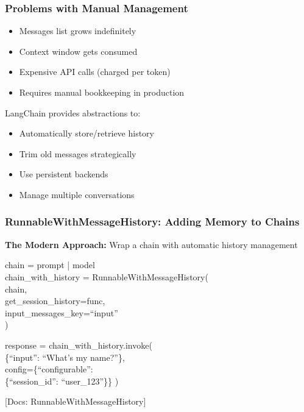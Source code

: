 \documentclass[aspectratio=169,11pt]{beamer}
\newcommand{\docref}[1]{{\scriptsize\color{docgray}[Docs: #1]}}
\begin{document}
\begin{frame}
  \frametitle{Problems with Manual Management}
  \begin{warningbox}
    \begin{itemize}
      \item Messages list grows indefinitely
      \item Context window gets consumed
      \item Expensive API calls (charged per token)
      \item Requires manual bookkeeping in production
    \end{itemize}
  \end{warningbox}
  \vspace{0.6em}
  \begin{tipbox}
    LangChain provides abstractions to:
    \begin{itemize}
      \item Automatically store/retrieve history
      \item Trim old messages strategically
      \item Use persistent backends
      \item Manage multiple conversations
    \end{itemize}
  \end{tipbox}
\end{frame}

\begin{frame}
  \frametitle{RunnableWithMessageHistory: Adding Memory to Chains}
  \textbf{The Modern Approach:} Wrap a chain with automatic history management
  \vspace{0.4em}
  \begin{codebox}[Setup]
    \ttfamily\small
    chain = prompt | model \\
    chain\_with\_history = RunnableWithMessageHistory( \\
    \hspace{2em} chain, \\
    \hspace{2em} get\_session\_history=func, \\
    \hspace{2em} input\_messages\_key=``input'' \\
    )
  \end{codebox}
  \vspace{0.3em}
  \begin{codebox}[Usage]
    \ttfamily\small
    response = chain\_with\_history.invoke( \\
    \hspace{2em} \{``input'': ``What's my name?''\}, \\
    \hspace{2em} config=\{``configurable'': \\
    \hspace{4em} \{``session\_id'': ``user\_123''\}\} )
  \end{codebox}
  \docref{RunnableWithMessageHistory}
\end{frame}
\end{document}
